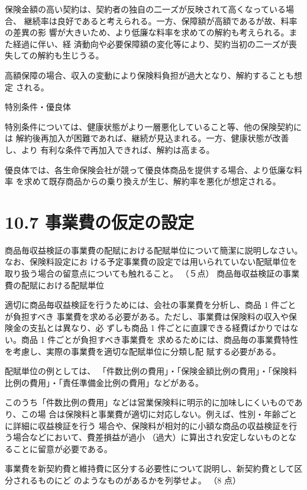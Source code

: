 \documentclass[report,gutter=10mm,fore-edge=10mm,uplatex,dvipdfmx]{jlreq}
\begin{document}
保険金額の高い契約は、契約者の独自の二一ズが反映されて高くなっている場合、
継続率は良好であると考えられる。一方、保障額が高額であるが故、料率の差異の影
響が大きいため、より低廉な料率を求めての解約も考えられる。また経過に伴い、経
済動向や必要保障額の変化等により、契約当初の二一ズが喪失しての解約も生じうる。

高額保障の場合、収入の変動により保険料負担が過大となり、解約することも想定
される。

特別条件・優良体

特別条件については、健康状態がより一層悪化していること等、他の保険契約には
解約後再加入が困難であれば、継続が見込まれる。一方、健康状態が改善し、より
有利な条件で再加入できれば、解約は高まる。

優良体では、各生命保険会社が競って優良体商品を提供する場合、より低廉な料率
を求めて既存商品からの乗り換えが生じ、解約率を悪化が想定される。

\section{10.7 事業費の仮定の設定}

商品毎収益検証の事業費の配賦における配賦単位について簡潔に説明しなさい。なお、保険料設定にお
ける予定事業費の設定では用いられていない配賦単位を取り扱う場合の留意点についても触れること。
（５点）
\answer{}
商品毎収益検証の事業費の配賦における配賦単位

 適切に商品毎収益検証を行うためには、会社の事業費を分析し、商品 1 件ごとが負担すべき
事業費を求める必要がある。ただし、事業費は保険料の収入や保険金の支払とは異なり、必
ずしも商品 1 件ごとに直課できる経費ばかりではない。商品 1 件ごとが負担すべき事業費を
求めるためには、商品毎の事業費特性を考慮し、実際の事業費を適切な配賦単位に分類し配
賦する必要がある。

 配賦単位の例としては、
「件数比例の費用」・「保険金額比例の費用」・「保険料比例の費用」・「責任準備金比例の費用」などがある。

 このうち「件数比例の費用」などは営業保険料に明示的に加味しにくいものであり、この場
合は保険料と事業費が適切に対応しない。例えば、性別・年齢ごとに詳細に収益検証を行う
場合や、保険料が相対的に小額な商品の収益検証を行う場合などにおいて、費差損益が過小
（過大）に算出され安定しないものとなることに留意が必要である。

事業費を新契約費と維持費に区分する必要性について説明し、新契約費として区分されるものにど
のようなものがあるかを列挙せよ。
（8 点）
\end{document}
